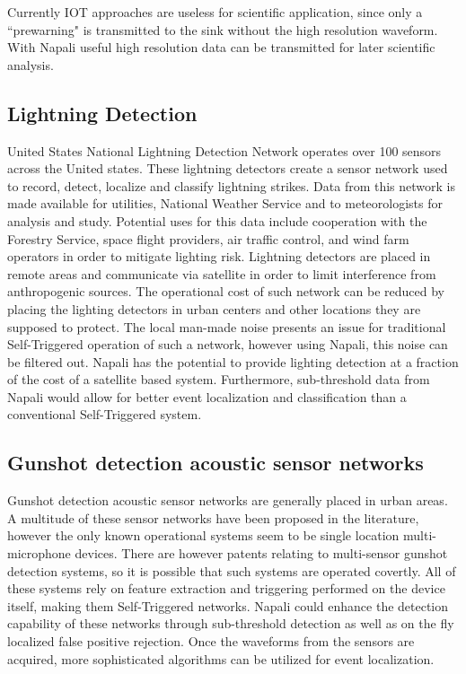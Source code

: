 Currently IOT approaches are useless for scientific application, since only a ``prewarning" is transmitted to the sink without the high resolution waveform.
With Napali useful high resolution data can be transmitted for later scientific analysis.

\subsection{Lightning Detection}\label{subsec:lightning-detection}
United States National Lightning Detection Network operates over 100 sensors across the United states\cite{cummins1998combined}.
These lightning detectors create a sensor network used to record, detect, localize and  classify lightning strikes.
Data from this network is made available for utilities, National Weather Service and to meteorologists for analysis and study.
Potential uses for this data include cooperation with the Forestry Service, space flight providers, air traffic control, and wind farm operators in order to mitigate lighting risk.\cite{nag2013upgrade}
Lightning detectors are placed in remote areas and communicate via satellite in order to limit interference from anthropogenic sources.
The operational cost of such network can be reduced by placing the lighting detectors in urban centers and other locations they are supposed to protect.
The local man-made noise presents an issue for traditional Self-Triggered operation of such a network, however using Napali, this noise can be filtered out.
Napali has the potential to provide lighting detection at a fraction of the cost of a satellite based system.
Furthermore, sub-threshold data from Napali would allow for better event localization and classification than a conventional Self-Triggered system.

\subsection{Gunshot detection acoustic sensor networks}\label{subsec:gunshot-detection-acustic-sensor-network}
Gunshot detection acoustic sensor networks are generally placed in urban areas.
A multitude of these sensor networks have been proposed in the literature, however the only known operational systems seem to be single
location multi-microphone devices. \cite{bandi2012novel} \cite{khalid2013gunshot}
There are however patents relating to multi-sensor gunshot detection systems, so it is possible that such systems are operated covertly.
All of these systems rely on feature extraction and triggering performed on the device itself, making them Self-Triggered networks.
Napali could enhance the detection capability of these networks through sub-threshold detection as well as on the fly localized false positive rejection.
Once the waveforms from the sensors are acquired, more sophisticated algorithms can be utilized for event localization.

